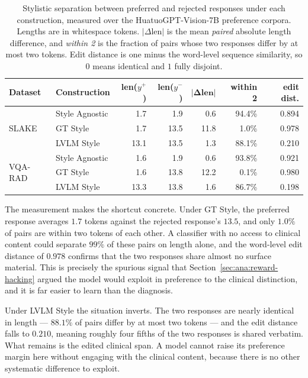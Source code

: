 \begin{table}[ht]
\centering
\small
\caption{Stylistic separation between preferred and rejected responses under each construction, measured over the HuatuoGPT-Vision-7B preference corpora. Lengths are in whitespace tokens. $|\Delta\text{len}|$ is the mean \emph{paired} absolute length difference, and \emph{within 2} is the fraction of pairs whose two responses differ by at most two tokens. Edit distance is one minus the word-level sequence similarity, so $0$ means identical and $1$ fully disjoint.}
\label{tab:style_gap}
\begin{tabular}{llrrrrr}
\toprule
\textbf{Dataset} & \textbf{Construction} & \textbf{len($y^+$)} & \textbf{len($y^-$)} & $\mathbf{|\Delta\text{len}|}$ & \textbf{within 2} & \textbf{edit dist.} \\
\midrule
\multirow{3}{*}{SLAKE}
 & Style Agnostic & 1.7  & 1.9  & 0.6  & 94.4\% & 0.894 \\
 & GT Style       & 1.7  & 13.5 & 11.8 & 1.0\%  & 0.978 \\
 & LVLM Style     & 13.1 & 13.5 & 1.3  & 88.1\% & 0.210 \\
\midrule
\multirow{3}{*}{VQA-RAD}
 & Style Agnostic & 1.6  & 1.9  & 0.6  & 93.8\% & 0.921 \\
 & GT Style       & 1.6  & 13.8 & 12.2 & 0.1\%  & 0.980 \\
 & LVLM Style     & 13.3 & 13.8 & 1.6  & 86.7\% & 0.198 \\
\bottomrule
\end{tabular}
\end{table}

The measurement makes the shortcut concrete. Under GT Style, the preferred response averages $1.7$ tokens against the rejected response's $13.5$, and only $1.0\%$ of pairs are within two tokens of each other. A classifier with no access to clinical content could separate $99\%$ of these pairs on length alone, and the word-level edit distance of $0.978$ confirms that the two responses share almost no surface material. This is precisely the spurious signal that Section~\ref{sec:ana:reward-hacking} argued the model would exploit in preference to the clinical distinction, and it is far easier to learn than the diagnosis.

Under LVLM Style the situation inverts. The two responses are nearly identical in length --- $88.1\%$ of pairs differ by at most two tokens --- and the edit distance falls to $0.210$, meaning roughly four fifths of the two responses is shared verbatim. What remains is the edited clinical span. A model cannot raise its preference margin here without engaging with the clinical content, because there is no other systematic difference to exploit.

